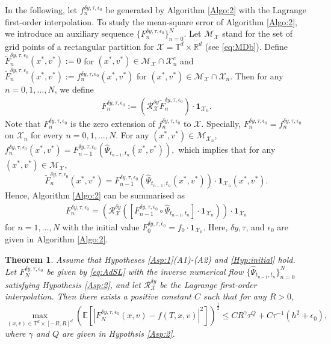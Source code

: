 \documentclass[11pt,reqno]{amsproc}
\newtheorem{theorem}[Def]{Theorem}
\newcommand{\R}{\mathbb{R}}
\numberwithin{equation}{section}
\newcommand{\E}{\mathbb{E}}\allowdisplaybreaks[4]
\begin{document}
In the following, let $f_n^{\delta y,\tau,\epsilon_0}$ be generated by Algorithm \ref{Algo:2} with the Lagrange first-order interpolation.
To study the mean-square error of Algorithm \ref{Algo:2}, we introduce an auxiliary sequence $\{F_n^{\delta y,\tau,\epsilon_0}\}_{n=0}^N$.
Let $\mathcal {M}_{\mathscr{X}}$ stand for the set of grid points of a rectangular partition for $\mathscr{X}=\mathbb{T}^d\times\R^d$ (see \eqref{eq:MDb}). 
Define 
$\tilde{F}^{\delta y,\tau,\epsilon_0}_{n}(x^*,v^*):=0$ for $(x^*,v^*)\in\mathcal{M}_\mathscr{X}\cap\mathscr{X}_n^{c}$ and $\tilde{F}^{\delta y,\tau,\epsilon_0}_{n}(x^*,v^*):={f}^{\delta y,\tau,\epsilon_0}_{n}(x^*,v^*)$ for $(x^*,v^*)\in \mathcal{M}_\mathscr{X}\cap\mathscr{X}_n$. Then for any $n=0,1,\ldots,N$, we define
\begin{align*}%
F^{\delta y,\tau,\epsilon_0}_{n}:=(\mathscr{R}_{\mathscr{X}}^{\delta y}\tilde{F}^{\delta y,\tau,\epsilon_0}_{n})\cdot\mathbf{1}_{\mathscr{X}_n}.
\end{align*}
 Note that $F^{\delta y,\tau,\epsilon_0}_{n}$
is the zero extension of $f^{\delta y,\tau,\epsilon_0}_{n}$ to $\mathscr{X}$.
 Specially, $F^{\delta y,\tau,\epsilon_0}_{n}=f^{\delta y,\tau,\epsilon_0}_{n}$ on $\mathscr{X}_n$ for every $n=0,1,\ldots,N$.
For any $(x^*,v^*)\in\mathcal{M}_{\mathscr{X}_n}$,
$f^{\delta y,\tau,\epsilon_0}_{n}(x^*,v^*)=F^{\delta y,\tau,\epsilon_0}_{n-1}(\widehat{\Psi}_{t_{n-1},t_{n}}(x^*,v^*)),$
which implies that for any $(x^*,v^*)\in\mathcal{M}_{\mathscr{X}}$,
\begin{equation*}
\tilde{F}^{\delta y,\tau,\epsilon_0}_n(x^*,v^*)=F^{\delta y,\tau,\epsilon_0}_{n-1}(\widehat{\Psi}_{t_{n-1},t_{n}}(x^*,v^*))\cdot\mathbf{1}_{\mathscr{X}_n}(x^*,v^*).
\end{equation*}
Hence, Algorithm \ref{Algo:2} can be summarised as
\begin{align}\label{eq:AdSL}
F^{\delta y,\tau,\epsilon_0}_{n}=(\mathscr{R}_{\mathscr{X}}^{\delta y}([F^{\delta y,\tau,\epsilon_0}_{n-1}\circ\widehat{\Psi}_{t_{n-1},t_{n}}]\cdot\mathbf{1}_{\mathscr{X}_n}))\cdot\mathbf{1}_{\mathscr{X}_n}
\end{align}
for $n=1,\ldots,N$
with the initial value $F^{\delta y,\tau,\epsilon_0}_{0}=f_0\cdot \mathbf{1}_{\mathscr{X}_0}$. Here, $\delta y,\tau$, and $\epsilon_0$ are given in Algorithm \ref{Algo:2}.


\begin{theorem}\label{thm:DSLC}
Assume that Hypotheses \ref{Asp:1}(A1)-(A2) and \ref{Hyp:initial} hold. 
Let $F^{\delta y,\tau,\epsilon_0}_N$ be given by \eqref{eq:AdSL} with 
the inverse numerical flow $\{\widehat{\Psi}_{t_{n-1},t_n}\}_{n=0}^N$ satisfying Hypothesis \ref{Asp:2}, and let $\mathscr{R}_{\mathscr{X}}^{\delta y}$
be the Lagrange first-order interpolation.
Then there exists a positive constant $C$ such that for any $R>0$,
\begin{equation*}%
\max_{(x,v)\in\mathbb{T}^d\times [-R,R]^d}\left(\E\left[|F^{\delta y,\tau,\epsilon_0}_N(x,v)-f(T,x,v)|^2\right]\right)^{\frac12}\le CR^\gamma\tau^Q +C\tau^{-1}(h^2+\epsilon_0),
\end{equation*}
where $\gamma$ and $Q$ are given in Hypothsis \ref{Asp:2}.
\end{theorem}
\end{document}
